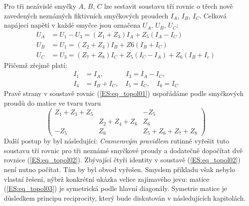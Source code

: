 \begin{example}
  Pro tři nezávislé smyčky \(A\), \(B\), \(C\) lze sestavit soustavu tří rovnic o třech nově 
  zavedených neznámých fiktivních smyčkových proudech \(I_A\), \(I_B\), \(I_C\). Celková napájecí 
  napětí v každé smyčce jsou označena \(U_A\), \(U_B\), \(U_C\):
  \begin{align}\label{ES:eq_topol01}
    U_A &= U_1-U_3 = (Z_1 + Z_3)I_A +Z_5(I_A - I_C)           \nonumber\\
    U_B &= U_1     = (Z_2 + Z_4)I_B+Z6(I_B + I_C)             \nonumber\\
    U_C &= U_3     = (Z_7 + Z_8)I_C+Z_5(I_C - I_A)+Z_6(I_B+I_c)  
  \end{align}
  Přičemž zřejmě platí:
  \begin{subequations}
    \begin{align}\label{ES:eq_topol02}
     I_1 &= I_A,       \qquad\quad\; I_3 = I_A - I_C,                   \\
     I_4 &= I_B + I_C, \quad I_5 = I_C, \quad I_6 = I_C
    \end{align}
    \end{subequations}
  Pravé strany v soustavě rovnic (\ref{ES:eq_topol01}) uspořádáme podle smyčkových proudů do   
  matice ve tvaru tvaru
  \begin{equation}\label{ES:eq_topol03}
   \left(
     \begin{array}{cccc}
       Z_1+Z_3+Z_5  &              &-Z_5  \\
                    & Z_2+Z_4+Z_6  & Z_6  \\
               -Z_5 & Z_6          & Z_5+Z_6+Z_7+Z_8 
     \end{array}
   \right) 
  \end{equation}
  Další postup by byl následující: \emph{Cramerovým pravidlem} rutinně vyřešit tuto soustavu tří 
  rovnic pro tři neznámé smyčkové proudy a dodatečně dopočítat dvě rovnice (\ref{ES:eq_topol02}). 
  Zbývající čtyři identity v soustavě (\ref{ES:eq_topol02}) není nutno počítat. Tím by byl obvod 
  vyřešen. Smyslem příkladu však nebylo vlastní řešení, nýbrž konkrétní ukázka velice zajímavého 
  jevu: matice (\ref{ES:eq_topol03}) je symetrická podle hlavní diagonály. Symetrie matice je 
  důsledkem principu reciprocity, který bude diskutován v následujících kapitolách.
\end{example}